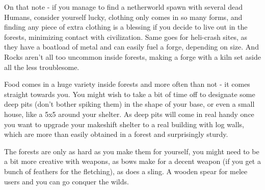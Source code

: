 On that note - if you manage to find a netherworld spawn with several dead Humans, consider yourself lucky, clothing only comes in so many forms, and finding any piece of extra clothing is a blessing if you decide to live out in the forests, minimizing contact with civilization.
Same goes for heli-crash sites, as they have a boatload of metal and can easily fuel a forge, depending on size. And Rocks aren't all too uncommon inside forests, making a forge with a kiln set aside all the less troublesome.

Food comes in a huge variety inside forests and more often than not - it comes straight towards you. You might wish to take a bit of time off to designate some deep pits (don't bother spiking them) in the shape of your base, or even a small house, like a 5x5 around your shelter. As deep pits will come in real handy once you want to upgrade your makeshift shelter to a real building with log walls, which are more than easily obtained in a forest and surprisingly sturdy.

The forests are only as hard as you make them for yourself, you might need to be a bit more creative with weapons, as bows make for a decent weapon (if you get a bunch of feathers for the fletching), as does a sling. A wooden spear for melee users and you can go conquer the wilds.